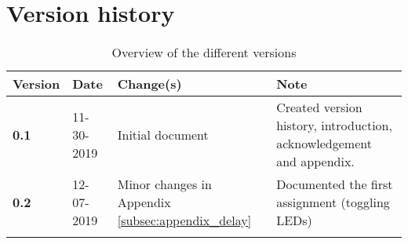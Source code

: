 \section*{Version history}


\begin{longtable}{| p{} | p{} | p{} | p{} |}

    \hline
    \textcolor{darkpink}{Version} & \textcolor{darkpink}{Date} & \textcolor{darkpink}{Change(s)} & \textcolor{darkpink}{Note} \\
     
    \hline
    \textbf{0.1} & 11-30-2019 & Initial document & Created version history, introduction, acknowledgement and appendix. \\

    \hline

    \textbf{0.2} & 12-07-2019 & Minor changes in Appendix \ref{subsec:appendix_delay} & Documented the first assignment (toggling LEDs) \\

    \hline

    \caption{Overview of the different versions}
    \label{tab:version}

\end{longtable}
